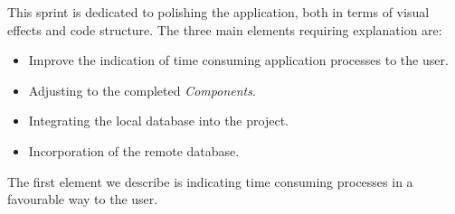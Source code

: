 This sprint is dedicated to polishing the application, both in terms of visual effects and code structure.
The three main elements requiring explanation are:

\begin{itemize}
\item Improve the indication of time consuming application processes to the user.
\item Adjusting \launcher to the completed \textit{\giraf Components}.
\item Integrating the local database into the \launcher project.
\item Incorporation of the remote database.
\end{itemize}

The first element we describe is indicating time consuming processes in a favourable way to the user.